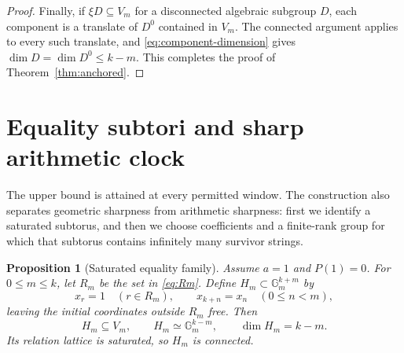 \documentclass[11pt]{article}
\newtheorem{proposition}[theorem]{Proposition}
\theoremstyle{definition}
\theoremstyle{remark}
\newcommand{\Gm}{\mathbb{G}_{m}}
\begin{document}
\begin{proof}
Finally, if $\xi D\subseteq V_m$ for a disconnected algebraic subgroup $D$, each component is a translate of $D^0$ contained in $V_m$.  The connected argument applies to every such translate, and \eqref{eq:component-dimension} gives $\dim D=\dim D^0\leq k-m$.  This completes the proof of Theorem~\ref{thm:anchored}.
\end{proof}

\section{Equality subtori and sharp arithmetic clock}
\label{sec:equality}

The upper bound is attained at every permitted window.  The construction also separates geometric sharpness from arithmetic sharpness: first we identify a saturated subtorus, and then we choose coefficients and a finite-rank group for which that subtorus contains infinitely many survivor strings.

\begin{proposition}[Saturated equality family]
\label{prop:equality}
Assume $a=1$ and $P(1)=0$.  For $0\leq m\leq k$, let $R_m$ be the set in \eqref{eq:Rm}.  Define $H_m\subset\Gm^{k+m}$ by
\begin{equation}
x_r=1\quad(r\in R_m),
\qquad x_{k+n}=x_n\quad(0\leq n<m),
\label{eq:Hm-definition}
\end{equation}
leaving the initial coordinates outside $R_m$ free.  Then
\[
H_m\subseteq V_m,\qquad
H_m\simeq\Gm^{k-m},\qquad
\dim H_m=k-m.
\]
Its relation lattice is saturated, so $H_m$ is connected.
\end{proposition}
\end{document}
